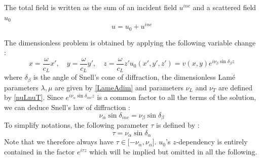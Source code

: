 The total field is written as the sum of an incident field $u^{inc}$ and a scattered field $u_0$
\begin{equation}
u=u_0+u^{inc}
\label{C4:scat}
\end{equation}

The dimensionless problem is obtained by applying the following variable change :
\begin{subequations}
\begin{equation}
x=\dfrac{\omega}{c_L}x', \hspace{1em} y=\dfrac{\omega}{c_L}y', \hspace{1em} z=\dfrac{\omega}{c_L}z'
\end{equation}
\begin{equation}
u_0(x',y',z')=v(x,y)e^{i\nu_{\beta}\sin\delta_{\beta}z}
\end{equation}
\label{C4:adiming}
\end{subequations}
where $\delta_{\beta}$ is the angle of Snell's cone of diffraction, the dimensionless Lamé parameters $\lambda,\mu$ are given by \eqref{LameAdim} and parameters $\nu_L$ and $\nu_T$ are defined by \eqref{nuLnuT}. Since $e^{i\nu_{\alpha}\sin\delta_{inc}z}$ is a common factor to all the terms of the solution, we can deduce Snell's law of diffraction :
\begin{equation}
\nu_{\alpha}\sin\delta_{inc}=\nu_{\beta}\sin\delta_{\beta}
\label{C4:Snelldiff}
\end{equation}
To simplify notations, the following parameter $\tau$ is defined by :
\begin{equation}
\tau=\nu_{\alpha}\sin\delta_{\alpha}
\label{deftau}
\end{equation}
Note that we therefore always have $\tau \in \lbrack -\nu_{\alpha}, \nu_{\alpha} \rbrack$. $u_0$'s $z$-dependency is entirely contained in the factor $e^{i\tau z}$ which will be implied but omitted in all the following.


